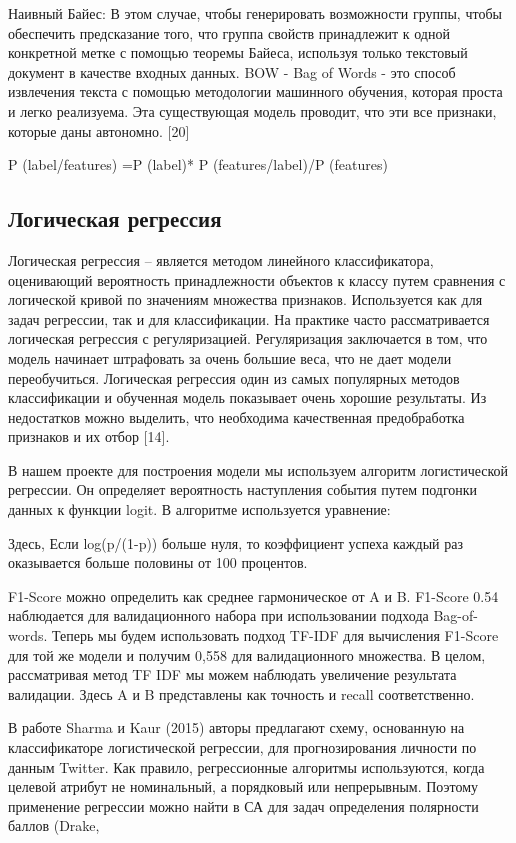 Наивный Байес: В этом случае, чтобы генерировать возможности группы, чтобы
обеспечить предсказание того, что группа свойств принадлежит к одной конкретной
метке с помощью теоремы Байеса, используя только текстовый документ в качестве
входных данных. BOW - Bag of Words - это способ извлечения текста с помощью
методологии машинного обучения, которая проста и легко реализуема. Эта
существующая модель проводит, что эти все признаки, которые даны автономно. [20]

P (label/features) =P (label)* P (features/label)/P (features)
\cite{article18}

\subsection{Логическая регрессия}

Логическая регрессия – является методом линейного классификатора, оценивающий
вероятность принадлежности объектов к классу путем сравнения с логической кривой
по значениям множества признаков. Используется как для задач регрессии, так и
для классификации.  На практике часто рассматривается логическая регрессия с
регуляризацией. Регуляризация заключается в том, что модель начинает штрафовать
за очень большие веса, что не дает модели переобучиться. Логическая регрессия
один из самых популярных методов классификации и обученная модель показывает
очень хорошие результаты. Из недостатков можно выделить, что необходима
качественная предобработка признаков и их отбор [14].~\cite{article9}

В нашем проекте для построения модели мы используем алгоритм логистической
регрессии. Он определяет вероятность наступления события путем подгонки данных к
функции logit. В алгоритме используется уравнение:

Здесь, Если log(p/(1-p)) больше нуля, то коэффициент успеха каждый раз
оказывается больше половины от 100 процентов.

F1-Score можно определить как среднее гармоническое от A и B. F1-Score 0.54
наблюдается для валидационного набора при использовании подхода Bag-of-words.
Теперь мы будем использовать подход TF-IDF для вычисления F1-Score для той же
модели и получим 0,558 для валидационного множества. В целом, рассматривая метод
TF IDF мы можем наблюдать увеличение результата валидации. Здесь A и B
представлены как точность и recall соответственно.~\cite{article12}


В работе Sharma и Kaur (2015) авторы предлагают схему, основанную на
классификаторе логистической регрессии, для прогнозирования личности по данным
Twitter.  Как правило, регрессионные алгоритмы используются, когда целевой
атрибут не номинальный, а порядковый или непрерывным. Поэтому применение
регрессии можно найти в СА для задач определения полярности баллов (Drake,
\cite{article13}

